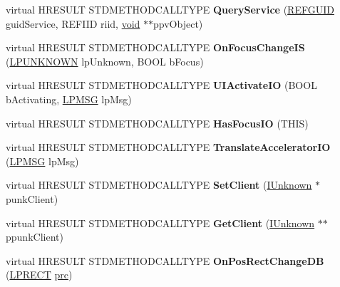 \begin{DoxyCompactItemize}
\item 
\mbox{\label{class_c_menu_desk_bar_a472429c2da312c84aa4af79e4a94ab31}} 
virtual H\+R\+E\+S\+U\+LT S\+T\+D\+M\+E\+T\+H\+O\+D\+C\+A\+L\+L\+T\+Y\+PE {\bfseries Query\+Service} (\hyperlink{struct___g_u_i_d}{R\+E\+F\+G\+U\+ID} guid\+Service, R\+E\+F\+I\+ID riid, \hyperlink{interfacevoid}{void} $\ast$$\ast$ppv\+Object)
\item 
\mbox{\label{class_c_menu_desk_bar_a24bf5680505873368aff038f7502ec46}} 
virtual H\+R\+E\+S\+U\+LT S\+T\+D\+M\+E\+T\+H\+O\+D\+C\+A\+L\+L\+T\+Y\+PE {\bfseries On\+Focus\+Change\+IS} (\hyperlink{interface_i_unknown}{L\+P\+U\+N\+K\+N\+O\+WN} lp\+Unknown, B\+O\+OL b\+Focus)
\item 
\mbox{\label{class_c_menu_desk_bar_ac2cd041bdbfff02fc1ebdb1c465fcee3}} 
virtual H\+R\+E\+S\+U\+LT S\+T\+D\+M\+E\+T\+H\+O\+D\+C\+A\+L\+L\+T\+Y\+PE {\bfseries U\+I\+Activate\+IO} (B\+O\+OL b\+Activating, \hyperlink{structtag_m_s_g}{L\+P\+M\+SG} lp\+Msg)
\item 
\mbox{\label{class_c_menu_desk_bar_a386644e479d329d6f7f1eea144ed8337}} 
virtual H\+R\+E\+S\+U\+LT S\+T\+D\+M\+E\+T\+H\+O\+D\+C\+A\+L\+L\+T\+Y\+PE {\bfseries Has\+Focus\+IO} (T\+H\+IS)
\item 
\mbox{\label{class_c_menu_desk_bar_ae5ba79e439eca0ff074514754c695a34}} 
virtual H\+R\+E\+S\+U\+LT S\+T\+D\+M\+E\+T\+H\+O\+D\+C\+A\+L\+L\+T\+Y\+PE {\bfseries Translate\+Accelerator\+IO} (\hyperlink{structtag_m_s_g}{L\+P\+M\+SG} lp\+Msg)
\item 
\mbox{\label{class_c_menu_desk_bar_ab9478d43eb9154b4c3c53808846fec6a}} 
virtual H\+R\+E\+S\+U\+LT S\+T\+D\+M\+E\+T\+H\+O\+D\+C\+A\+L\+L\+T\+Y\+PE {\bfseries Set\+Client} (\hyperlink{interface_i_unknown}{I\+Unknown} $\ast$punk\+Client)
\item 
\mbox{\label{class_c_menu_desk_bar_a605129ba51a0103cabf0f8bd053f6669}} 
virtual H\+R\+E\+S\+U\+LT S\+T\+D\+M\+E\+T\+H\+O\+D\+C\+A\+L\+L\+T\+Y\+PE {\bfseries Get\+Client} (\hyperlink{interface_i_unknown}{I\+Unknown} $\ast$$\ast$ppunk\+Client)
\item 
\mbox{\label{class_c_menu_desk_bar_a05d73bfe7013f9f6aaec4348326bfa5d}} 
virtual H\+R\+E\+S\+U\+LT S\+T\+D\+M\+E\+T\+H\+O\+D\+C\+A\+L\+L\+T\+Y\+PE {\bfseries On\+Pos\+Rect\+Change\+DB} (\hyperlink{structtag_r_e_c_t}{L\+P\+R\+E\+CT} \hyperlink{structtag_r_e_c_t}{prc})
\end{DoxyCompactItemize}
